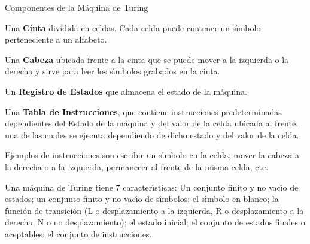 \documentclass[10pd,hyperref={colorlinks=true}]{beamer}
\begin{document}

\begin{frame}{Componentes de la M\'aquina de Turing}

\vfill

Una {\bf Cinta} dividida en celdas. Cada celda puede contener un 
s\'{\i}mbolo perteneciente a un alfabeto.

Una {\bf Cabeza} ubicada frente a la cinta que se puede mover a la 
izquierda o la derecha y sirve para leer los s\'{\i}mbolos grabados en 
la cinta.

Un {\bf Registro de Estados} que almacena el estado de la m\'aquina.

Una {\bf Tabla de Instrucciones}, que contiene instrucciones 
predeterminadas dependientes del Estado de la m\'aquina y del valor de 
la celda ubicada al frente, una de las cuales se ejecuta dependiendo de 
dicho estado y del valor de la celda.

Ejemplos de instrucciones son escribir un s\'{\i}mbolo en la celda, 
mover la cabeza a la derecha o a la izquierda, permanecer al frente de 
la misma celda, ctc.

Una m\'aquina de Turing tiene 7 caracter\'{\i}sticas: Un conjunto finito 
y no vac\'{\i}o de estados; un conjunto finito y no vac\'{\i}o de 
s\'{\i}mbolos; el s\'{\i}mbolo en blanco; la funci\'on de transici\'on 
(L o desplazamiento a la izquierda, R o desplazamiento a la derecha, N o 
no desplazamiento); el estado inicial; el conjunto de estados finales o 
aceptables; el conjunto de instrucciones.

\vfill

\end{frame}


\begin{frame}

 \vfill
 \centerline{}

 \vfill

\end{frame}


\begin{frame}

 \vfill
 \centerline{}

 \vfill

\end{frame}
\end{document}
